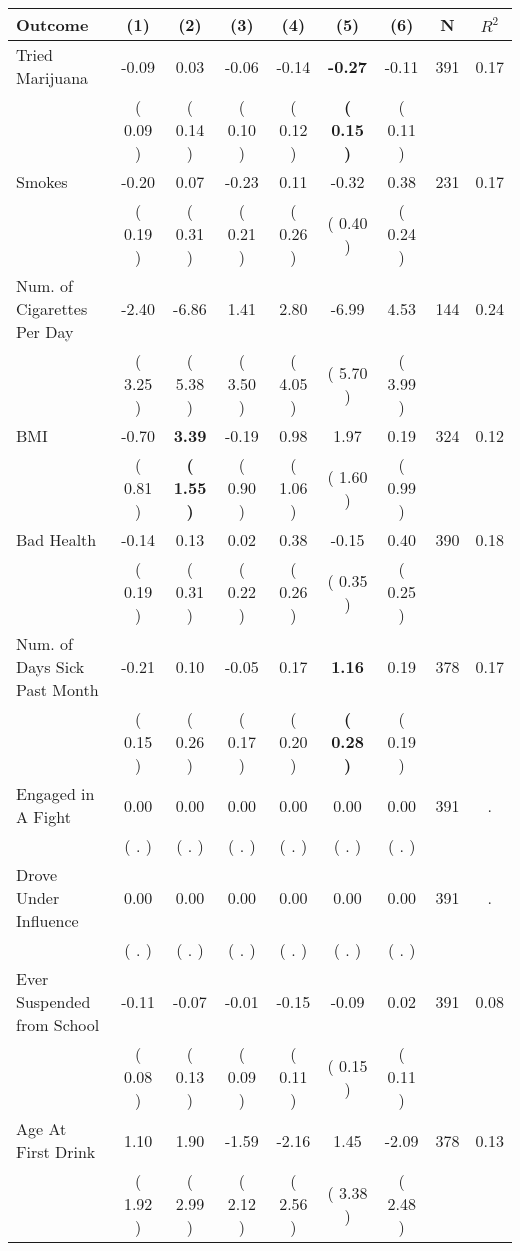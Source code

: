 \begin{tabular}{lcccccccc}
\toprule
 \textbf{Outcome} & \textbf{(1)} & \textbf{(2)} & \textbf{(3)} & \textbf{(4)} & \textbf{(5)} & \textbf{(6)} & \textbf{N} & \textbf{$ R^2$} \\
\midrule
Tried Marijuana &     -0.09 &      0.03 &     -0.06 &     -0.14 & \textbf{    -0.27} &     -0.11 & 391 &       0.17 \\ 
 & (     0.09 ) & (     0.14 ) & (     0.10 ) & (     0.12 ) & \textbf{(     0.15 )} & (     0.11 ) & \\
Smokes &     -0.20 &      0.07 &     -0.23 &      0.11 &     -0.32 &      0.38 & 231 &       0.17 \\ 
 & (     0.19 ) & (     0.31 ) & (     0.21 ) & (     0.26 ) & (     0.40 ) & (     0.24 ) & \\
Num. of Cigarettes Per Day &     -2.40 &     -6.86 &      1.41 &      2.80 &     -6.99 &      4.53 & 144 &       0.24 \\ 
 & (     3.25 ) & (     5.38 ) & (     3.50 ) & (     4.05 ) & (     5.70 ) & (     3.99 ) & \\
BMI &     -0.70 & \textbf{     3.39} &     -0.19 &      0.98 &      1.97 &      0.19 & 324 &       0.12 \\ 
 & (     0.81 ) & \textbf{(     1.55 )} & (     0.90 ) & (     1.06 ) & (     1.60 ) & (     0.99 ) & \\
Bad Health &     -0.14 &      0.13 &      0.02 &      0.38 &     -0.15 &      0.40 & 390 &       0.18 \\ 
 & (     0.19 ) & (     0.31 ) & (     0.22 ) & (     0.26 ) & (     0.35 ) & (     0.25 ) & \\
Num. of Days Sick Past Month &     -0.21 &      0.10 &     -0.05 &      0.17 & \textbf{     1.16} &      0.19 & 378 &       0.17 \\ 
 & (     0.15 ) & (     0.26 ) & (     0.17 ) & (     0.20 ) & \textbf{(     0.28 )} & (     0.19 ) & \\
Engaged in A Fight &      0.00 &      0.00 &      0.00 &      0.00 &      0.00 &      0.00 & 391 &          . \\ 
 & (        . ) & (        . ) & (        . ) & (        . ) & (        . ) & (        . ) & \\
Drove Under Influence &      0.00 &      0.00 &      0.00 &      0.00 &      0.00 &      0.00 & 391 &          . \\ 
 & (        . ) & (        . ) & (        . ) & (        . ) & (        . ) & (        . ) & \\
Ever Suspended from School &     -0.11 &     -0.07 &     -0.01 &     -0.15 &     -0.09 &      0.02 & 391 &       0.08 \\ 
 & (     0.08 ) & (     0.13 ) & (     0.09 ) & (     0.11 ) & (     0.15 ) & (     0.11 ) & \\
Age At First Drink &      1.10 &      1.90 &     -1.59 &     -2.16 &      1.45 &     -2.09 & 378 &       0.13 \\ 
 & (     1.92 ) & (     2.99 ) & (     2.12 ) & (     2.56 ) & (     3.38 ) & (     2.48 ) & \\
\bottomrule
\end{tabular}
